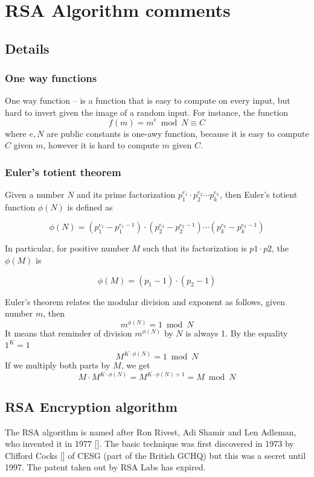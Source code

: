 \chapter{RSA Algorithm comments}\label{ch:rsa-algorithm-comments}


\section{Details}\label{sec:details}

\subsection{One way functions}\label{subsec:one-way-functions}
One way function -- is a function that is easy to compute on every input, but
hard to invert given the image of a random input.
For instance, the function
\begin{equation*}
    f(m) = m^e \bmod N \equiv C
\end{equation*}
where $e, N$ are public constants is one-awy function,
because it is easy to compute $C$ given $m$, however it is hard to compute $m$ given $C$.

\subsection{Euler's totient theorem}\label{subsec:euler-function}
Given a number $N$ and its prime factorization $p_1^{e_1}\cdot p_2^{e_2} \cdots p_k^{e_k}$, then Euler's totient function
$\phi(N)$ is defined as

\[
    \phi(N) = (p_1^{e_1} - p_1^{e_1 - 1}) \cdot (p_2^{e_2} - p_2^{e_2 - 1}) \cdots (p_k^{e_k} - p_k^{e_k - 1})
\]

In particular, for positive number $M$ such that its factorization is $p1 \cdot p2$, the $\phi(M)$ is

\[
    \phi(M) = (p_1 -1) \cdot (p_2 - 1)
\]

Euler's theorem relates the modular division and exponent as follows, given number $m$, then
\[
    m^{\phi(N)} = 1 \bmod N
\]
It means that reminder of division $m^{\phi(N)}$ by $N$ is always 1.
By the equality $1^K = 1$
\[
    M^{K \cdot \phi(N)} = 1 \bmod N
\]
If we multiply both parts by $M$, we get
\[
    M \cdot M^{K \cdot \phi(N)} = M^{K \cdot \phi(N) + 1} = M \bmod N
\]


\section{RSA Encryption algorithm}\label{sec:rsa-encryption-algorithm}
The RSA algorithm is named after Ron Rivest, Adi Shamir and Len Adleman, who invented it in 1977 [\cite{rivest1978method}].
The basic technique was first discovered in 1973 by Clifford Cocks [\cite{cocks1973note}] of CESG (part of the British GCHQ)
but this was a secret until 1997.
The patent taken out by RSA Labs has expired.

